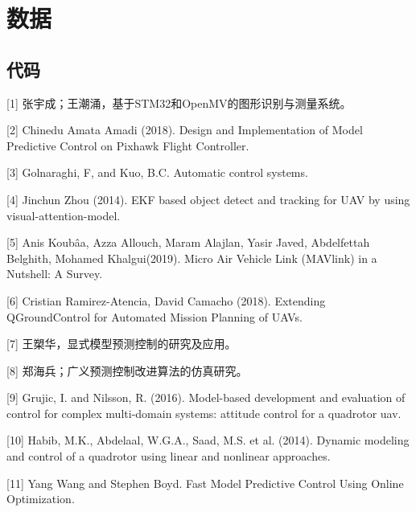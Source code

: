 \chapter{数据}

\section{代码}





\begin{thebibliography}{A1}
[1] 张宇成；王潮涌，基于STM32和OpenMV的图形识别与测量系统。

[2] Chinedu Amata Amadi (2018). Design and Implementation of Model Predictive Control on Pixhawk Flight Controller.

[3] Golnaraghi, F, and Kuo, B.C. Automatic control systems.

[4] Jinchun Zhou (2014). EKF based object detect and tracking for UAV by using visual-attention-model.

[5] Anis Koubâa, Azza Allouch, Maram Alajlan, Yasir Javed, Abdelfettah Belghith, Mohamed Khalgui(2019). Micro Air Vehicle Link (MAVlink) in a Nutshell: A Survey.

[6] Cristian Ramirez-Atencia, David Camacho (2018). Extending QGroundControl for Automated Mission Planning of UAVs.

[7] 王槊华，显式模型预测控制的研究及应用。

[8] 郑海兵；广义预测控制改进算法的仿真研究。

[9] Grujic, I. and Nilsson, R. (2016). Model-based development and evaluation of control
for complex multi-domain systems: attitude control for a quadrotor uav.

[10] Habib, M.K., Abdelaal, W.G.A., Saad, M.S. et al. (2014). Dynamic modeling and
control of a quadrotor using linear and nonlinear approaches.

[11] Yang Wang and Stephen Boyd. Fast Model Predictive Control Using Online Optimization.

\end{thebibliography}